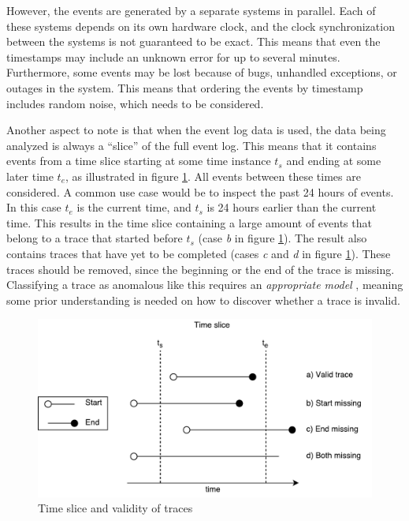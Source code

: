 However, the events are generated by a separate systems in parallel.
Each of these systems depends on its own hardware clock, and the clock synchronization between the systems is not guaranteed to be exact. 
This means that even the timestamps may include an unknown error for up to several minutes.
Furthermore, some events may be lost because of bugs, unhandled exceptions, or outages in the system.
This means that ordering the events by timestamp includes random noise, which needs to be considered.

Another aspect to note is that when the event log data is used, the data being analyzed is always a ``slice'' of the full event log.
This means that it contains events from a time slice starting at some time instance $t_s$ and ending at some later time $t_e$, as illustrated in figure \ref{fig:timeslice}. 
All events between these times are considered. 
A common use case would be to inspect the past 24 hours of events. 
In this case $t_e$ is the current time, and $t_s$ is 24 hours earlier than the current time. 
This results in the time slice containing a large amount of events that belong to a trace that started before $t_s$ (case \textit{b} in figure \ref{fig:timeslice}).
The result also contains traces that have yet to be completed (cases \textit{c} and \textit{d} in figure \ref{fig:timeslice}).
These traces should be removed, since the beginning or the end of the trace is missing.
Classifying a trace as anomalous like this requires an \emph{appropriate model} \cite{bezerra2009anomaly},
meaning some prior understanding is needed on how to discover whether a trace is invalid.

\begin{figure}[htb]
\centering \includegraphics[width=0.8\linewidth]{gfx/figures/timeslice.pdf}
\caption{Time slice and validity of traces}
\label{fig:timeslice}
\end{figure}

